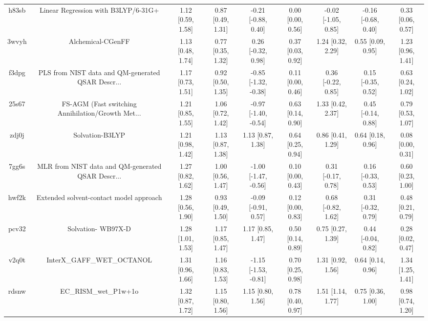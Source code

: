 \documentclass{article}
\begin{document}
\begin{center}
\begin{longtable}{|ccccccccc|}
 h83sb &                Linear Regression with B3LYP/6-31G+ &  1.12 [0.59, 1.58] &  0.87 [0.49, 1.31] &   -0.21 [-0.88, 0.40] &  0.00 [0.00, 0.56] &  -0.02 [-1.05, 0.85] &  -0.16 [-0.68, 0.40] &     0.33 [0.06, 0.57] \\
 3wvyh &                                  Alchemical-CGenFF &  1.13 [0.48, 1.74] &  0.77 [0.35, 1.32] &    0.26 [-0.32, 0.98] &  0.37 [0.03, 0.92] &    1.24 [0.32, 2.29] &    0.55 [0.09, 0.95] &     1.23 [0.96, 1.41] \\
 f3dpg &  PLS from NIST data and QM-generated QSAR Descr... &  1.17 [0.73, 1.51] &  0.92 [0.50, 1.35] &  -0.85 [-1.32, -0.38] &  0.11 [0.00, 0.46] &   0.36 [-0.22, 0.85] &   0.15 [-0.35, 0.52] &     0.63 [0.24, 1.02] \\
 25s67 &  FS-AGM (Fast switching Annihilation/Growth Met... &  1.21 [0.85, 1.55] &  1.06 [0.72, 1.42] &  -0.97 [-1.40, -0.54] &  0.63 [0.14, 0.90] &    1.33 [0.42, 2.37] &   0.45 [-0.14, 0.88] &     0.79 [0.53, 1.07] \\
 zdj0j &                                    Solvation-B3LYP &  1.21 [0.98, 1.42] &  1.13 [0.87, 1.38] &     1.13 [0.87, 1.38] &  0.64 [0.25, 0.94] &    0.86 [0.41, 1.29] &    0.64 [0.18, 0.96] &     0.08 [0.00, 0.31] \\
 7gg6s &  MLR from NIST data and QM-generated QSAR Descr... &  1.27 [0.82, 1.62] &  1.00 [0.56, 1.47] &  -1.00 [-1.47, -0.56] &  0.10 [0.00, 0.43] &   0.31 [-0.17, 0.78] &   0.16 [-0.33, 0.53] &     0.60 [0.23, 1.00] \\
 hwf2k &            Extended solvent-contact model approach &  1.28 [0.56, 1.90] &  0.93 [0.49, 1.50] &   -0.09 [-0.91, 0.57] &  0.12 [0.00, 0.83] &   0.68 [-0.82, 1.62] &   0.31 [-0.32, 0.79] &     0.48 [0.21, 0.79] \\
 pcv32 &                                 Solvation- WB97X-D &  1.28 [1.01, 1.53] &  1.17 [0.85, 1.47] &     1.17 [0.85, 1.47] &  0.50 [0.14, 0.89] &    0.75 [0.27, 1.39] &   0.44 [-0.04, 0.82] &     0.28 [0.02, 0.47] \\
 v2q0t &                         InterX\_GAFF\_WET\_OCTANOL &  1.31 [0.96, 1.66] &  1.16 [0.83, 1.53] &  -1.15 [-1.53, -0.81] &  0.70 [0.25, 0.98] &    1.31 [0.92, 1.56] &    0.64 [0.14, 0.96] &     1.34 [1.25, 1.41] \\
 rdsnw &                              EC\_RISM\_wet\_P1w+1o &  1.32 [0.87, 1.72] &  1.15 [0.80, 1.56] &     1.15 [0.80, 1.56] &  0.78 [0.40, 0.97] &    1.51 [1.14, 1.77] &    0.75 [0.36, 1.00] &     0.98 [0.74, 1.20] \\

\end{longtable}
\end{center}
\end{document}
